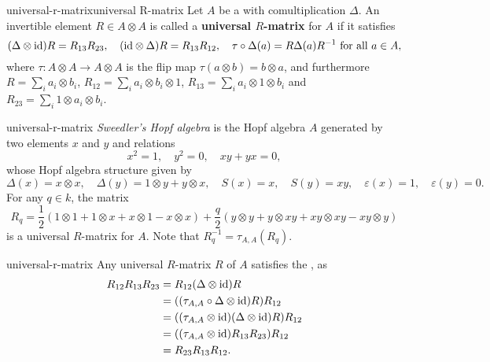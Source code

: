\begin{topic}{universal-r-matrix}{universal R-matrix}
    Let $A$ be a  with comultiplication $\Delta$. An invertible element $R \in A \otimes A$ is called a \textbf{universal $R$-matrix} for $A$ if it satisfies
    \[ (\Delta \otimes \textup{id}) R = R_{13} R_{23}, \quad (\textup{id} \otimes \Delta) R = R_{13} R_{12}, \quad \tau \circ \Delta (a) = R \Delta(a) R^{-1} \textup{ for all } a \in A , \]
    where $\tau \colon A \otimes A \to A \otimes A$ is the flip map $\tau(a \otimes b) = b \otimes a$, and furthermore $R = \sum_i a_i \otimes b_i$, $R_{12} = \sum_i a_i \otimes b_i \otimes 1$, $R_{13} = \sum_i a_i \otimes 1 \otimes b_i$ and $R_{23} = \sum_i 1 \otimes a_i \otimes b_i$.
\end{topic}

\begin{example}{universal-r-matrix}
    \textit{Sweedler's Hopf algebra} is the Hopf algebra $A$ generated by two elements $x$ and $y$ and relations
    \[ x^2 = 1, \quad y^2 = 0, \quad xy + yx = 0 , \]
    whose Hopf algebra structure given by
    \[ \Delta(x) = x \otimes x, \quad \Delta(y) = 1 \otimes y + y \otimes x, \quad S(x) = x, \quad S(y) = xy, \quad \varepsilon(x) = 1, \quad \varepsilon(y) = 0 . \]
    For any $q \in k$, the matrix
    \[ R_q = \frac{1}{2} (1 \otimes 1 + 1 \otimes x + x \otimes 1 - x \otimes x) + \frac{q}{2} (y \otimes y + y \otimes xy + xy \otimes xy - xy \otimes y) \]
    is a universal $R$-matrix for $A$. Note that $R_q^{-1} = \tau_{A, A}(R_q)$.
\end{example}

\begin{example}{universal-r-matrix}
    Any universal $R$-matrix $R$ of $A$ satisfies the , as
    \[ \begin{aligned}
        R_{12} R_{13} R_{23}
            &= R_{12} (\Delta \otimes \textup{id}) R \\
            &= ((\tau_{A, A} \circ \Delta \otimes \textup{id}) R) R_{12} \\ 
            &= ((\tau_{A, A} \otimes \textup{id})(\Delta \otimes \textup{id}) R) R_{12} \\
            &= ((\tau_{A, A} \otimes \textup{id}) R_{13} R_{23}) R_{12} \\
            &= R_{23} R_{13} R_{12} . 
    \end{aligned} \]
\end{example}

